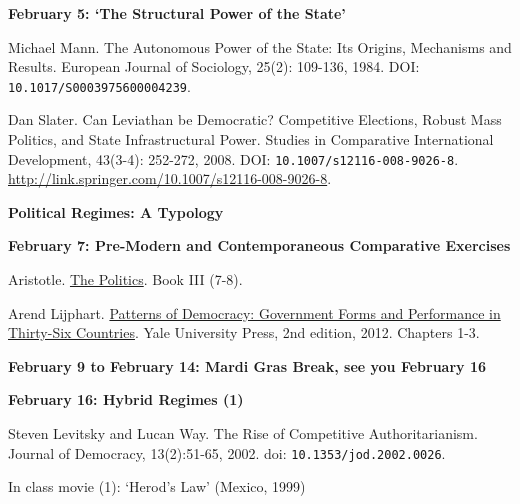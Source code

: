 \documentclass[letterpaper]{article}
\renewenvironment{itemize}{
  \begin{list}{}{
    \setlength{\leftmargin}{1.5em}
  }
}{
  \end{list}
}
\begin{document}
\begin{enumerate}
\begin{itemize}
	\item {\bf February 5: `The Structural Power of the State'}
		\begin{itemize}
			\item[$\bullet$] Michael Mann. The Autonomous Power of the State: Its Origins, Mechanisms and Results. European Journal of Sociology, 25(2): 109-136, 1984. DOI: \texttt{10.1017/S0003975600004239}.
			\item[$\bullet$] Dan Slater. Can Leviathan be Democratic? Competitive Elections, Robust Mass Politics, and State Infrastructural Power. Studies in Comparative International Development, 43(3-4): 252-272, 2008. DOI: \texttt{10.1007/s12116-008-9026-8}. \url{http://link.springer.com/10.1007/s12116-008-9026-8}.
		\end{itemize}
	\end{itemize}





\item {\bf Political Regimes: A Typology}
	\begin{itemize}

		\item {\bf February 7: Pre-Modern and Contemporaneous Comparative Exercises}
			\begin{itemize}
				\item[$\bullet$] Aristotle. \href{https://socialsciences.mcmaster.ca/econ/ugcm/3ll3/aristotle/Politics.pdf}{The Politics}. Book III (7-8).
				\item[$\bullet$] Arend Lijphart. \href{https://e-edu.nbu.bg/pluginfile.php/830138/mod_resource/content/1/Lijphart%2C%20A.%20Patterns%20of%20Democracy%20-%20Government%20Forms%20and%20Performance%20in%20Thirty-Six%20Countries%20%282012%29.pdf}{Patterns of Democracy: Government Forms and Performance in Thirty-Six Countries}. Yale University Press, 2nd edition, 2012. Chapters 1-3.
			\end{itemize}

		\item {\bf February 9 to February 14: Mardi Gras Break, see you February 16}


		\item {\bf February 16: Hybrid Regimes (1)}
			\begin{itemize}
				\item[$\bullet$] Steven Levitsky and Lucan Way. The Rise of Competitive Authoritarianism. Journal of Democracy, 13(2):51-65, 2002. doi: \texttt{10.1353/jod.2002.0026}.
				\item[$\bullet$] In class movie (1): `Herod's Law' (Mexico, 1999)
			\end{itemize}


\end{itemize}
\end{enumerate}
\end{document}
